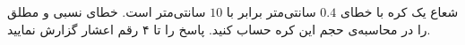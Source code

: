 شعاع یک کره با خطای $0.4$ سانتی‌متر برابر با $10$ سانتی‌متر است. خطای نسبی و مطلق را در محاسبه‌ی حجم این کره حساب کنید. پاسخ را تا ۴ رقم اعشار گزارش نمایید.

\begin{comment}

پاسخ:

$$z = \frac{4}{3}\pi r^{3}$$
$$\Delta_{z} = {4}\pi r^{2}\Delta_{r}$$
$$\Delta_{z} = 502.6548$$
$$\delta_{z} = \frac{{4}\pi r^{2}\delta_{r}}{\frac{4}{3}\pi r^{3}} = 1.2$$

\end{comment}